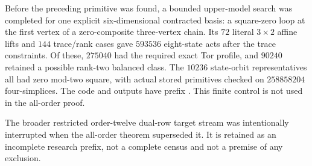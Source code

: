 \begin{remark}
\label{C:dual-row-act-control-scope}
Before the preceding primitive was found, a bounded upper-model
search was completed for one explicit six-dimensional contracted
basis: a square-zero loop at the first vertex of a zero-composite
three-vertex chain.  Its $72$ literal $3\times2$ affine lifts and
$144$ trace/rank cases gave $593536$ eight-state acts after the
trace constraints.  Of these, $275040$ had the required exact
Tor profile, and $90240$ retained a possible rank-two balanced
class.  The $10236$ state-orbit representatives all had zero
mod-two square, with actual stored primitives checked on
$258858204$ four-simplices.
The code and outputs have prefix .
This finite control is not used in the all-order proof.

The broader restricted order-twelve dual-row target stream
 was intentionally
interrupted when the all-order theorem superseded it.  It is
retained as an incomplete research prefix, not a complete census
and not a premise of any exclusion.
\end{remark}
